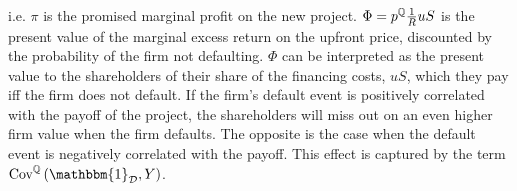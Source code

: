 \documentclass[../main.tex]{subfiles}
\begin{document}
        i.e. $\pi$ is the promised marginal profit on the new project. 
        $\Phi = p^{\mathbb{Q}} \frac{1}{R} u S$
        is the present value of the marginal excess return on the upfront price, 
        discounted by the probability of the firm not defaulting.
        $\Phi$ can be interpreted as the present value to the shareholders of their share of the financing costs, $uS$,
        which they pay iff the firm does not default. 
        If the firm's default event is positively correlated with the payoff of the project,
        the shareholders will miss out on an even higher firm value when the firm defaults.
        The opposite is the case when the default event is negatively correlated with the payoff.
        This effect is captured by the term 
        $\text{Cov}^{\mathbb{Q}}\left(\mathbbm{1}_{\mathcal{D}}, Y\right)$.
\end{document}
